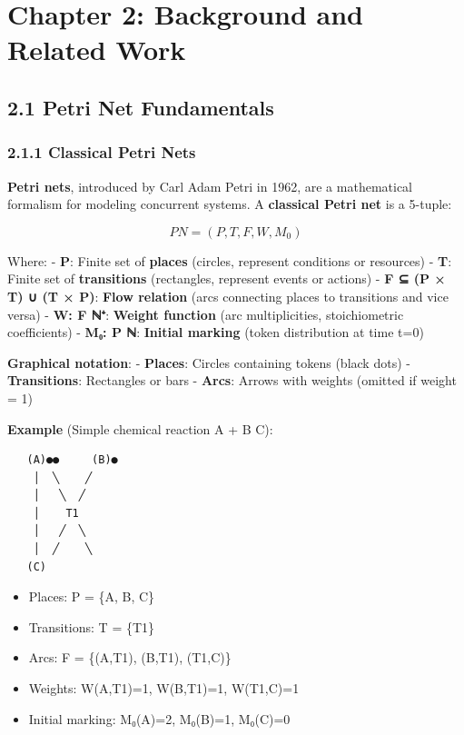 \hypertarget{chapter-2-background-and-related-work}{%
\chapter{Chapter 2: Background and Related
Work}\label{chapter-2-background-and-related-work}}

\hypertarget{petri-net-fundamentals}{%
\section{2.1 Petri Net Fundamentals}\label{petri-net-fundamentals}}

\hypertarget{classical-petri-nets}{%
\subsection{2.1.1 Classical Petri Nets}\label{classical-petri-nets}}

\textbf{Petri nets}, introduced by Carl Adam Petri in 1962, are a
mathematical formalism for modeling concurrent systems. A
\textbf{classical Petri net} is a 5-tuple:

\[
PN = (P, T, F, W, M_0)
\]

Where: - \textbf{P}: Finite set of \textbf{places} (circles, represent
conditions or resources) - \textbf{T}: Finite set of
\textbf{transitions} (rectangles, represent events or actions) -
\textbf{F ⊆ (P × T) ∪ (T × P)}: \textbf{Flow relation} (arcs connecting
places to transitions and vice versa) - \textbf{W: F \textrightarrow ℕ⁺}:
\textbf{Weight function} (arc multiplicities, stoichiometric
coefficients) - \textbf{M₀: P \textrightarrow ℕ}: \textbf{Initial marking} (token
distribution at time t=0)

\textbf{Graphical notation}: - \textbf{Places}: Circles containing
tokens (black dots) - \textbf{Transitions}: Rectangles or bars -
\textbf{Arcs}: Arrows with weights (omitted if weight = 1)

\textbf{Example} (Simple chemical reaction A + B \textrightarrow C):

\begin{lstlisting}
   (A)●●     (B)●
    │  ╲    ╱
    │   ╲  ╱
    │    T1
    │   ╱  ╲
    │  ╱    ╲
   (C)       
\end{lstlisting}

\begin{itemize}
\tightlist
\item
  Places: P = \{A, B, C\}
\item
  Transitions: T = \{T1\}
\item
  Arcs: F = \{(A,T1), (B,T1), (T1,C)\}
\item
  Weights: W(A,T1)=1, W(B,T1)=1, W(T1,C)=1
\item
  Initial marking: M₀(A)=2, M₀(B)=1, M₀(C)=0
\end{itemize}

